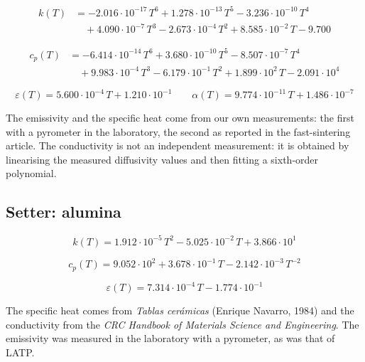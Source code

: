 \documentclass[11pt,a4paper]{article}
\begin{document}
\begin{equation}
\begin{aligned}
k(T) &= -2.016\cdot10^{-17}\,T^{6} + 1.278\cdot10^{-13}\,T^{5}
      - 3.236\cdot10^{-10}\,T^{4} \\
     &\quad + 4.090\cdot10^{-7}\,T^{3} - 2.673\cdot10^{-4}\,T^{2}
      + 8.585\cdot10^{-2}\,T - 9.700
\end{aligned}
\end{equation}

\begin{equation}
\begin{aligned}
c_p(T) &= -6.414\cdot10^{-14}\,T^{6} + 3.680\cdot10^{-10}\,T^{5}
        - 8.507\cdot10^{-7}\,T^{4} \\
       &\quad + 9.983\cdot10^{-4}\,T^{3} - 6.179\cdot10^{-1}\,T^{2}
        + 1.899\cdot10^{2}\,T - 2.091\cdot10^{4}
\end{aligned}
\end{equation}

\begin{equation}
\varepsilon(T) = 5.600\cdot10^{-4}\,T + 1.210\cdot10^{-1}
\qquad
\alpha(T) = 9.774\cdot10^{-11}\,T + 1.486\cdot10^{-7}
\end{equation}

The emissivity and the specific heat come from our own measurements: the
first with a pyrometer in the laboratory, the second as reported in the
fast-sintering article. The conductivity is not an independent measurement:
it is obtained by linearising the measured diffusivity values and then
fitting a sixth-order polynomial.

\subsection{Setter: alumina}

\begin{equation}
k(T) = 1.912\cdot10^{-5}\,T^{2} - 5.025\cdot10^{-2}\,T + 3.866\cdot10^{1}
\end{equation}

\begin{equation}
c_p(T) = 9.052\cdot10^{2} + 3.678\cdot10^{-1}\,T
         - 2.142\cdot10^{-3}\,T^{-2}
\end{equation}

\begin{equation}
\varepsilon(T) = 7.314\cdot10^{-4}\,T - 1.774\cdot10^{-1}
\end{equation}

The specific heat comes from \emph{Tablas cerámicas} (Enrique Navarro,
1984) and the conductivity from the \emph{CRC Handbook of Materials Science
and Engineering}. The emissivity was measured in the laboratory with a
pyrometer, as was that of LATP.
\end{document}
